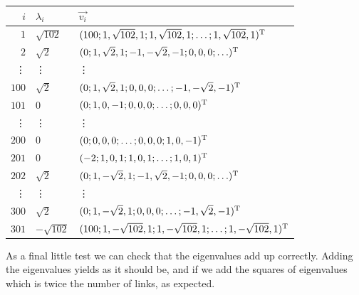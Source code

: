 \begin{tabular}{r l l}
$i$ & $\lambda_i$ & $\vec{v_i}$ \\\hline
$1$ & $\sqrt{102}$ & $(100; 1,\sqrt{102},1; 1,\sqrt{102},1; \ldots; 1,\sqrt{102},1)^{\rm T}$ \\
$2$ & $\sqrt{2}$ & $(0; 1,\sqrt{2},1; -1,-\sqrt{2},-1; 0,0,0; \ldots)^{\rm T}$ \\
\vdots & \vdots & \vdots \\
$100$ & $\sqrt{2}$ & $(0; 1,\sqrt{2},1; 0,0,0; \ldots; -1,-\sqrt{2},-1)^{\rm T}$ \\
$101$ & $0$ & $(0; 1,0,-1; 0,0,0; \ldots; 0,0,0)^{\rm T}$ \\
\vdots & \vdots & \vdots \\
$200$ & $0$ & $(0; 0,0,0; \ldots; 0,0,0; 1,0,-1)^{\rm T}$ \\
$201$ & $0$ & $(-2; 1,0,1; 1,0,1; \ldots; 1,0,1)^{\rm T}$ \\
$202$ & $\sqrt{2}$ & $(0; 1,-\sqrt{2},1; -1,\sqrt{2},-1; 0,0,0; \ldots)^{\rm T}$ \\
\vdots & \vdots & \vdots \\
$300$ & $\sqrt{2}$ & $(0; 1,-\sqrt{2},1; 0,0,0; \ldots; -1,\sqrt{2},-1)^{\rm T}$ \\
$301$ & $-\sqrt{102}$ & $(100; 1,-\sqrt{102},1; 1,-\sqrt{102},1; \ldots;1,-\sqrt{102},1)^{\rm T}$
\end{tabular}

As a final little test we can check that the eigenvalues add up correctly. 
Adding the eigenvalues yields 
as it should be, and if we add the squares of eigenvalues
which is twice the number of links, as expected.
